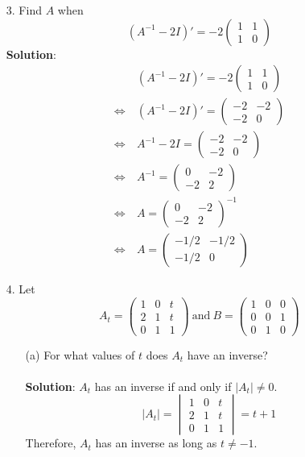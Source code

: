 \documentclass{article}
\begin{document}
\begin{enumerate}
    \item[3. ] Find $A$ when $$(A^{-1} - 2I)' = -2\begin{pmatrix}1 &1\\1 &0\end{pmatrix}$$
    \textbf{Solution}: 
    \begin{align*}
                        &\ (A^{-1} - 2I)' = -2\begin{pmatrix}1 &1\\1 &0\end{pmatrix} \\
        \Leftrightarrow &\ (A^{-1} - 2I)' = \begin{pmatrix}-2 &-2\\-2 &0\end{pmatrix} \\
        \Leftrightarrow &\ A^{-1} - 2I = \begin{pmatrix}-2 &-2\\-2 &0\end{pmatrix} \\
        \Leftrightarrow &\ A^{-1} = \begin{pmatrix}0 &-2\\-2 &2\end{pmatrix} \\
        \Leftrightarrow &\ A = \begin{pmatrix}0 &-2\\-2 &2\end{pmatrix}^{-1} \\
        \Leftrightarrow &\ A = \begin{pmatrix}-1/2 &-1/2\\-1/2 &0\end{pmatrix}
    \end{align*}
    
    \item[4. ] Let $$A_t = \begin{pmatrix}1 &0 &t\\2 &1 &t\\0 &1 &1\end{pmatrix}\ \textrm{and}\ B=\begin{pmatrix}1 &0 &0\\0 &0 &1\\0 &1 &0\end{pmatrix}$$
        \begin{enumerate}
            \item[(a)] For what values of $t$ does $A_t$ have an inverse? \\\\
            \textbf{Solution}: $A_t$ has an inverse if and only if $|A_t| \neq 0$.
            $$|A_t| = \begin{vmatrix}1 &0 &t\\2 &1 &t\\0 &1 &1\end{vmatrix} = t+1$$
            Therefore, $A_t$ has an inverse as long as $t \neq -1$. \\
            

\end{enumerate}
\end{enumerate}
\end{document}
